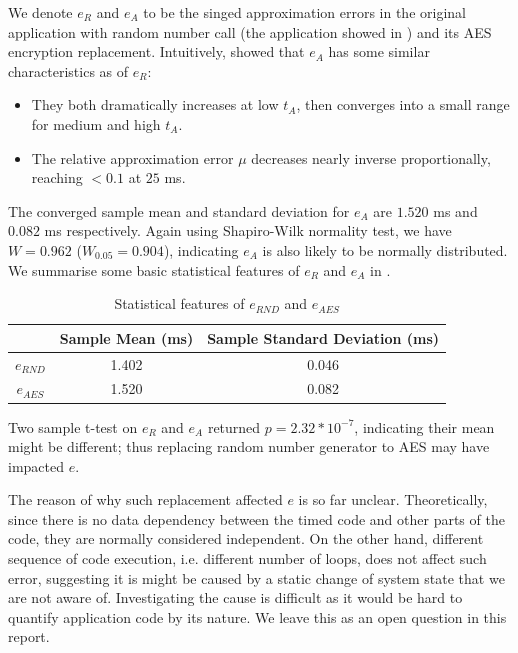 We denote $e_{R}$ and $e_{A}$ to be the singed approximation errors in the original application with random number call (the application showed in ) and its AES encryption replacement. Intuitively,   showed that $e_{A}$ has some similar characteristics as of $e_{R}$:
\begin{itemize}
	\item They both dramatically increases at low $t_A$, then converges into a small range for medium and high $t_A$.
	\item The relative approximation error $\mu$ decreases nearly inverse proportionally, reaching $<0.1$ at $25$ ms.
\end{itemize}

The converged sample mean and standard deviation for $e_A$ are $1.520$ ms and $0.082$ ms respectively. Again using Shapiro-Wilk normality test, we have $W=0.962$ ($W_{0.05} = 0.904$), indicating $e_{A}$ is also likely to be normally distributed. We summarise some basic statistical features of $e_R$ and $e_A$ in .

\begin{table}[ht!]
	\center
	\begin{tabular}{|c|c|c|}
	\hline
	      & Sample Mean (ms) & Sample Standard Deviation (ms) \\ \hline
	$e_{RND}$ & 1.402            & 0.046                          \\ \hline
	$e_{AES}$ & 1.520            & 0.082                          \\ \hline
	\end{tabular}
	\caption{Statistical features of $e_{RND}$ and $e_{AES}$}
	\label{Tbl: Statistical features of eR and eA}
\end{table}

Two sample t-test on $e_R$ and $e_A$ returned $p=2.32 * 10^{-7}$, indicating their mean might be different; thus replacing random number generator to AES may have impacted $e$.

The reason of why such replacement affected $e$ is so far unclear. Theoretically, since there is no data dependency between the timed code and other parts of the code, they are normally considered independent. On the other hand, different sequence of code execution, i.e. different number of loops, does not affect such error, suggesting it is might be caused by a static change of  system state that we are not aware of. Investigating the cause is difficult as it would be hard to quantify  application code by its nature. We leave this as an open question in this report. 

